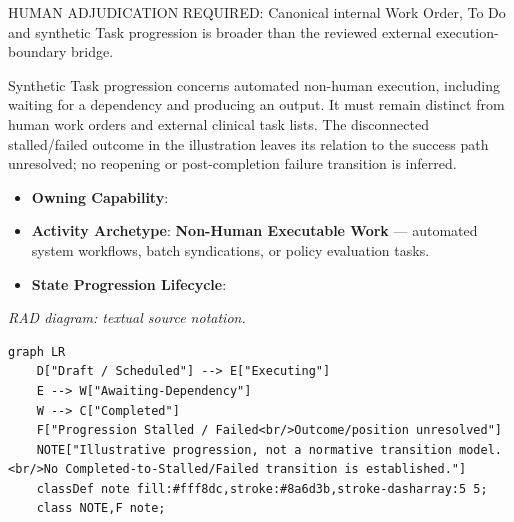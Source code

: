 HUMAN ADJUDICATION REQUIRED: Canonical internal Work Order, To Do and synthetic Task progression is broader than the reviewed external execution-boundary bridge.



Synthetic Task progression concerns automated non-human execution, including waiting for a dependency and producing an output. It must remain distinct from human work orders and external clinical task lists. The disconnected stalled/\allowbreak{}failed outcome in the illustration leaves its relation to the success path unresolved; no reopening or post-completion failure transition is inferred.



\begin{itemize}

\item
\textbf{Owning Capability}: \texttt{}



\item
\textbf{Activity Archetype}: \textbf{Non-Human Executable Work} — automated system workflows, batch syndications, or policy evaluation tasks.



\item
\textbf{State Progression Lifecycle}:



\end{itemize}

\textit{RAD diagram: textual source notation.}
\begin{Verbatim}[breaklines,fontsize=\footnotesize]
graph LR
    D["Draft / Scheduled"] --> E["Executing"]
    E --> W["Awaiting-Dependency"]
    W --> C["Completed"]
    F["Progression Stalled / Failed<br/>Outcome/position unresolved"]
    NOTE["Illustrative progression, not a normative transition model.<br/>No Completed-to-Stalled/Failed transition is established."]
    classDef note fill:#fff8dc,stroke:#8a6d3b,stroke-dasharray:5 5;
    class NOTE,F note;
\end{Verbatim}

